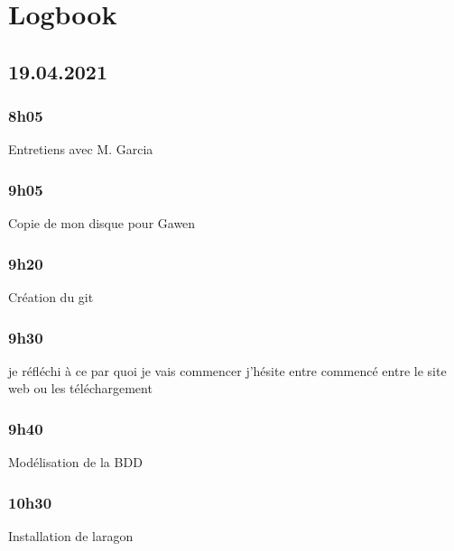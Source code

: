 \documentclass[a4paper,12pt,french]{sphinxmanual}
\begin{document}
\sphinxAtStartPar
{}


\chapter{Logbook}
\label{\detokenize{logbook:logbook}}\label{\detokenize{logbook::doc}}

\section{19.04.2021}
\label{\detokenize{logbook:id1}}

\subsection{8h05}
\label{\detokenize{logbook:h05}}
\sphinxAtStartPar
Entretiens avec M. Garcia


\subsection{9h05}
\label{\detokenize{logbook:id2}}
\sphinxAtStartPar
Copie de mon disque pour Gawen


\subsection{9h20}
\label{\detokenize{logbook:h20}}
\sphinxAtStartPar
Création du git


\subsection{9h30}
\label{\detokenize{logbook:h30}}
\sphinxAtStartPar
je réfléchi à ce par quoi je vais commencer j’hésite entre commencé entre le site web ou les téléchargement


\subsection{9h40}
\label{\detokenize{logbook:h40}}
\sphinxAtStartPar
Modélisation de la BDD

\sphinxAtStartPar
{}


\subsection{10h30}
\label{\detokenize{logbook:id3}}
\sphinxAtStartPar
Installation de laragon
\end{document}
